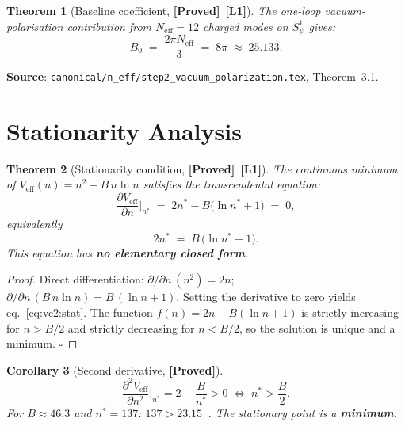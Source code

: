 \documentclass[12pt,a4paper]{article}
\newtheorem{theorem}{Theorem}[section]
\newtheorem{corollary}[theorem]{Corollary}
\theoremstyle{definition}
\theoremstyle{remark}
\newcommand{\PROVED}{\textbf{[Proved]}}
\newcommand{\Lone}{\textbf{[L1]}}
\begin{document}
\begin{theorem}[Baseline coefficient, \PROVED\ \Lone]
\label{thm:vc2:B0}
The one-loop vacuum-polarisation contribution from $N_{\mathrm{eff}} = 12$
charged modes on $S^1_\psi$ gives:
\[
  B_0 \;=\; \frac{2\pi N_{\mathrm{eff}}}{3} \;=\; 8\pi \;\approx\; 25.133.
\]
\end{theorem}

\noindent\textbf{Source}:
\texttt{canonical/n\_eff/step2\_vacuum\_polarization.tex}, Theorem~3.1.

\section{Stationarity Analysis}
\label{sec:vc2:stationary}

\begin{theorem}[Stationarity condition, \PROVED\ \Lone]
\label{thm:vc2:stat}
The continuous minimum of $V_{\mathrm{eff}}(n) = n^2 - B\,n\ln n$
satisfies the transcendental equation:
\begin{equation}
  \frac{\partial V_{\mathrm{eff}}}{\partial n}\bigg|_{n^*}
  \;=\;
  2n^* - B\bigl(\ln n^* + 1\bigr)
  \;=\; 0,
  \label{eq:vc2:dV}
\end{equation}
equivalently
\begin{equation}
  \boxed{2n^* \;=\; B\,\bigl(\ln n^* + 1\bigr).}
  \label{eq:vc2:stat}
\end{equation}
This equation has \textbf{no elementary closed form}.
\end{theorem}

\begin{proof}
Direct differentiation:
$\partial/\partial n\,(n^2) = 2n$;
$\partial/\partial n\,(B\,n\ln n) = B\,(\ln n + 1)$.
Setting the derivative to zero yields eq.~\eqref{eq:vc2:stat}.
The function $f(n) = 2n - B(\ln n + 1)$ is strictly increasing for $n > B/2$
and strictly decreasing for $n < B/2$, so the solution is unique and a minimum.
$\square$
\end{proof}

\begin{corollary}[Second derivative, \PROVED]
\label{cor:vc2:2nd}
\[
  \frac{\partial^2 V_{\mathrm{eff}}}{\partial n^2}\bigg|_{n^*}
  = 2 - \frac{B}{n^*}
  > 0
  \;\Longleftrightarrow\;
  n^* > \frac{B}{2}.
\]
For $B \approx 46.3$ and $n^* = 137$: $137 > 23.15$ \,\checkmark.
The stationary point is a \textbf{minimum}.
\end{corollary}
\end{document}
